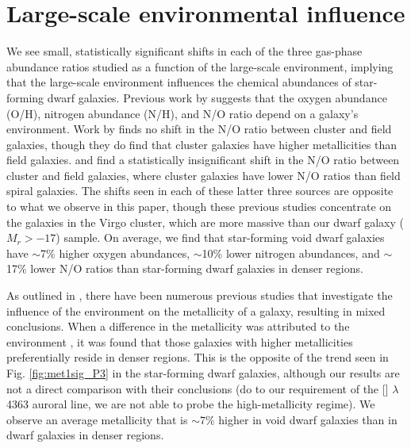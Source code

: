 %
%
\section[Discussion]{Large-scale environmental influence}

We see small, statistically significant shifts in each of the three gas-phase 
abundance ratios studied as a function of the large-scale environment, implying 
that the large-scale environment influences the chemical abundances of 
star-forming dwarf galaxies.  Previous work by \cite{Douglass17b} suggests that 
the oxygen abundance (O/H), nitrogen abundance (N/H), and N/O ratio depend on a 
galaxy's environment.  Work by \cite{Shields91} finds no shift in the N/O ratio 
between cluster and field galaxies, though they do find that cluster galaxies 
have higher metallicities than field galaxies.  \cite{Contini02} and 
\cite{Pilyugin02} find a statistically insignificant shift in the N/O ratio 
between cluster and field galaxies, where cluster galaxies have lower N/O ratios 
than field spiral galaxies.  The shifts seen in each of these latter three 
sources are opposite to what we observe in this paper, though these previous 
studies concentrate on the galaxies in the Virgo cluster, which are more massive 
than our dwarf galaxy ($M_r > -17$) sample.  On average, we find that 
star-forming void dwarf galaxies have $\sim$7\% higher oxygen abundances, 
$\sim$10\% lower nitrogen abundances, and $\sim$17\% lower N/O ratios than 
star-forming dwarf galaxies in denser regions.

As outlined in \cite{Douglass17a}, there have been numerous previous studies 
that investigate the influence of the environment on the metallicity of a 
galaxy, resulting in mixed conclusions.  When a difference in the metallicity 
was attributed to the environment \citep[as in][for example]{Pustilnik06,
Pustilnik11b,Pustilnik14,SanchezAlmeida16,Cooper08}, it was found that those 
galaxies with higher metallicities preferentially reside in denser regions.  
This is the opposite of the trend seen in Fig. \ref{fig:met1sig_P3} in the 
star-forming dwarf galaxies, although our results are not a direct comparison 
with their conclusions (do to our requirement of the [] $\lambda$4363 
auroral line, we are not able to probe the high-metallicity regime).  We observe 
an average metallicity that is $\sim$7\% higher in void dwarf galaxies than in 
dwarf galaxies in denser regions.


